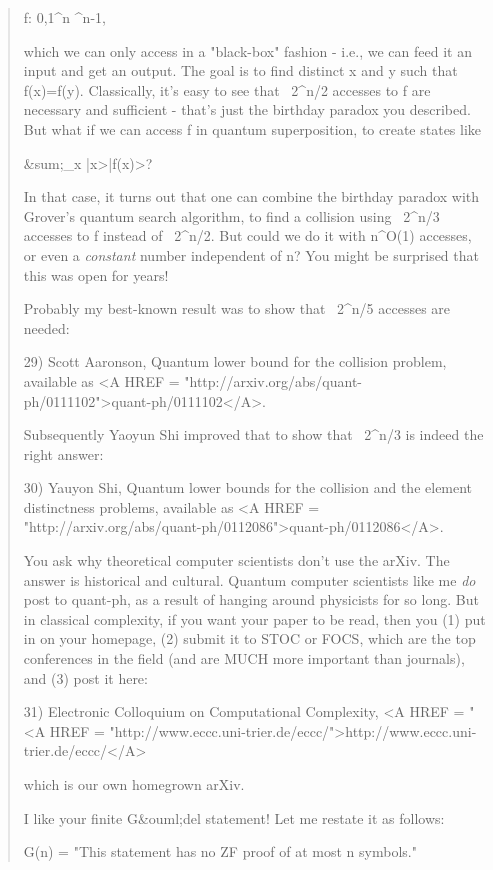 \begin{quote}
  f: {0,1}^{n} ^{n-1}, 

  which we can only access in a "black-box" fashion - i.e., we can feed 
  it an input and get an output.  The goal is to find distinct x and y 
  such that f(x)=f(y).  Classically, it's easy to see that ~2^{n/2} 
  accesses 
  to f are necessary and sufficient - that's just the birthday paradox you 
  described.  But what if we can access f in quantum superposition, to 
  create states like
 
  &sum;_{x} |x>|f(x)>?

  In that case, it turns out that one can combine the birthday paradox with 
  Grover's quantum search algorithm, to find a collision using ~2^{n/3}
  accesses to f instead of ~2^{n/2}.  But could we do it with 
  n^{O(1)} 
  accesses, or even a \emph{constant} number independent of n?  You might be 
  surprised that this was open for years!
 
  Probably my best-known result was to show that ~2^{n/5} accesses are 
  needed:

29) Scott Aaronson, Quantum lower bound for the collision problem,
available as
<A HREF = "http://arxiv.org/abs/quant-ph/0111102">quant-ph/0111102</A>.

Subsequently Yaoyun Shi improved that to 
  show that ~2^{n/3} is indeed the right answer:


30) Yauyon Shi, Quantum lower bounds for the collision and the element
distinctness problems, available as
 <A HREF = "http://arxiv.org/abs/quant-ph/0112086">quant-ph/0112086</A>.

  You ask why theoretical computer scientists don't use the arXiv.  The 
  answer is historical and cultural.  Quantum computer scientists like 
  me \emph{do} post to quant-ph, as a result of hanging around physicists for 
  so long.  But in classical complexity, if you want your paper to be read, 
  then you (1) put in on your homepage, (2) submit it to STOC or FOCS, 
  which are the top conferences in the field (and are MUCH more important 
  than journals), and (3) post it here:

31) 
Electronic Colloquium on Computational Complexity, 
<A HREF = "
<A HREF = "http://www.eccc.uni-trier.de/eccc/">http://www.eccc.uni-trier.de/eccc/</A>

 which is our own homegrown arXiv.

  I like your finite G&ouml;del statement!  Let me restate it as follows:
 
  G(n) = "This statement has no ZF proof of at most n symbols."
 

\end{quote}
